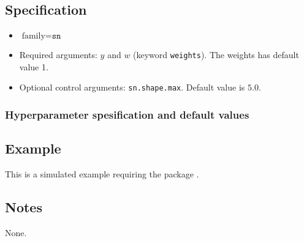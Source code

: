 \documentclass[a4paper,11pt]{article}
\begin{document}
\subsection*{Specification}

\begin{itemize}
\item $\text{family}=\texttt{sn}$
\item Required arguments: $y$ and $w$ (keyword \texttt{weights}). The
    weights has default value 1.
\item Optional control arguments: \texttt{sn.shape.max}. Default value is
    $5.0$.
\end{itemize}

\subsubsection*{Hyperparameter spesification and default values}




\subsection*{Example}

This is a simulated example requiring the package \verb@sn@.


\subsection*{Notes}

None.
\end{document}
